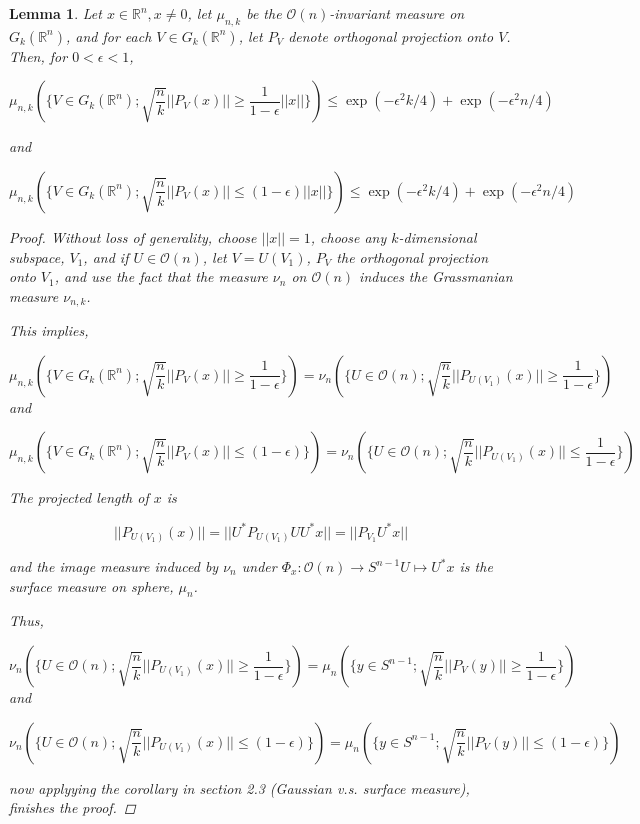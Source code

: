 \documentclass[12pt]{article}
\newtheorem{lemma}[thm]{Lemma}
\theoremstyle{remark}
\def\eps{\epsilon}
\newcommand{\reals}[0] { \mathbb{R}}
\newcommand{\cO}[0] { \mathcal{O} } %
\newcommand{\rarw}[0] { \rightarrow }
\begin{document}
\begin{lemma}

Let $x \in \reals^n, x \not = 0$, let $\mu_{n,k}$ be the $\cO(n)$-invariant measure on $G_k(\reals^n)$, and for each $V\in G_k(\reals^n)$, let $P_V$ denote orthogonal projection onto $V$. Then, for $0 < \eps < 1$,

$$
	\mu_{n,k} ( \{ V \in G_k( \reals^n) ; \sqrt{\frac{n}{k}}  || P_V(x)|| \ge \frac{1}{1- \eps} ||x||  \} )   \le  \exp{( - \eps^2 k /4 )} + \exp{( - \eps^2 n /4 )}
$$

and 

$$
	\mu_{n,k} ( \{ V \in G_k( \reals^n) ; \sqrt{\frac{n}{k}}  || P_V(x)|| \le (1- \eps) ||x||  \} )   \le  \exp{( - \eps^2 k /4 )} + \exp{( - \eps^2 n /4 )}
$$

\begin{proof} 

	Without loss of generality, choose $||x||=1$, choose any $k$-dimensional subspace, $V_1$, and if $U \in \cO(n)$, let $V=U(V_1)$, $P_V$ the orthogonal projection onto $V_1$, and use the fact that the measure $\nu_n$ on $\cO(n)$ induces the Grassmanian measure $\nu_{n,k}$.
	
	This implies, 
	
$$
	\mu_{n,k} ( \{ V \in G_k( \reals^n) ; \sqrt{\frac{n}{k}}  || P_V(x)|| \ge \frac{1}{1- \eps}   \} )   = \nu_n( \{  U \in \cO(n) ; \sqrt{\frac{n}{k}} || P_{U(V_1)} (x) || \ge \frac{1}{1-\eps} \} )
$$
	and
	
$$
	\mu_{n,k} ( \{ V \in G_k( \reals^n) ; \sqrt{\frac{n}{k}}  || P_V(x)|| \le (1- \eps)  \} )   = \nu_n( \{  U \in \cO(n) ; \sqrt{\frac{n}{k}} || P_{U(V_1)} (x) || \le \frac{1}{1-\eps} \} )
$$

The projected length of $x$ is

$$
	||P_{U(V_1)}(x)|| = || U^* P_{U(V_1)} U U^* x || = || P_{V_1} U^* x ||
$$

and the image measure induced by $\nu_n$ under $\Phi_x: \cO(n) \rarw S^{n-1} U \mapsto U^*x$ is the surface measure on sphere, $\mu_n$.

Thus,

$$
	\nu_n( \{  U \in \cO(n) ; \sqrt{\frac{n}{k}} || P_{U(V_1)} (x) || \ge \frac{1}{1-\eps} \} ) = \mu_{n} ( \{ y \in S^{n-1} ; \sqrt{\frac{n}{k}}  || P_V(y)|| \ge \frac{1}{1- \eps}   \} ) 
$$
	and
	
$$
	\nu_n( \{  U \in \cO(n) ; \sqrt{\frac{n}{k}} || P_{U(V_1)} (x) || \le (1-\eps) \} ) = \mu_{n} ( \{ y \in S^{n-1} ; \sqrt{\frac{n}{k}}  || P_V(y)|| \le (1- \eps)  \} ) 
$$

now applyying the corollary in section 2.3 (Gaussian v.s. surface measure), finishes the proof.

\end{proof}

\end{lemma}
\end{document}
